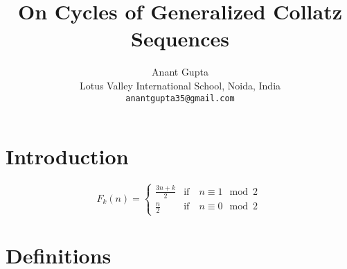 \documentclass[12pt]{article} %
\title{On Cycles of Generalized Collatz Sequences}
\author{\small Anant Gupta\\ 
    \small Lotus Valley International School, Noida, India\\
    \small \texttt{anantgupta35@gmail.com}}
\date{}
\begin{document}
\maketitle
\begin{abstract}

\end{abstract}

\section{Introduction}

\begin{equation}
F_k(n)= \begin{cases}    
    \frac{3n+k}{2}  & \text{if} \quad n \equiv 1 \mod 2\\
    \frac{n}{2}   & \text{if} \quad n \equiv 0 \mod2\
   \end{cases}
   \label{eqn:gcs}
\end{equation}


\section{Definitions}
\end{document}
